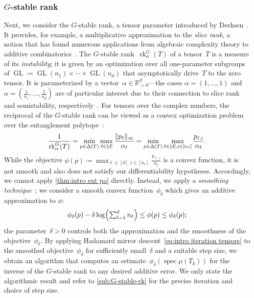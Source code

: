\documentclass[11pt,letterpaper]{article}
\numberwithin{equation}{section}
\newcommand{\RR}{\mathbb{R}}
\DeclareMathOperator{\spec}{spec}
\DeclareMathOperator{\rk}{rk}
\DeclareMathOperator{\GL}{GL}
\DeclarePairedDelimiter\norm{\lVert}{\rVert}
\begin{document}
\subsubsection{$G$-stable rank}
Next, we consider the $G$-stable rank, a tensor parameter introduced by Derksen~\cite{Derksen-22}.
It provides, for example, a multiplicative approximation to the \emph{slice rank}, a notion that has found numerous applications from algebraic complexity theory to additive combinatorics~\cite{Alon-13,Tao-16,Tao-Sawin-16,Blasiak-17,Kleinberg-18}.
The $G$-stable rank~$\rk^G_\alpha(T)$ of a tensor~$T$ is a measure of its \emph{instability}; it is given by an optimization over all one-parameter subgroups of $\GL \coloneqq \GL(n_1) \times \cdots \times \GL(n_d)$ that asymptotically drive~$T$ to the zero tensor.
It is parameterized by a vector~$\alpha\in\RR^d_{>0}$---the cases $\alpha=(1,\ldots,1)$ and $\alpha=(\frac{1}{n_1},\ldots,\frac{1}{n_d})$ are of particular interest due to their connection to slice rank and semistability, respectively~\cite[Props.~4.9 and~2.6]{Derksen-22}.
For tensors over the complex numbers, the reciprocal of the $G$-stable rank can be viewed as a convex optimization problem over the entanglement polytope~\cite{Derksen-22,Hirai2025}:
\[
    \frac1{\rk^G_\alpha(T)}
= \min_{p\in\Delta(T)}\max_{\ell\in [d]} \frac{\norm{p_\ell}_{\infty}}{\alpha_\ell}
= \min_{p\in\Delta(T)}\max_{\ell\in [d], i \in [n_\ell]} \frac{p_{\ell,i}}{\alpha_\ell}.
\]
While the objective $\phi(p)\coloneqq\max_{\ell\in [d],i \in [n_\ell]} \frac{p_{\ell,i}}{\alpha_\ell}$ is a convex function, it is not smooth and also does not satisfy our differentiability hypotheses.
Accordingly, we cannot apply \cref{thm:intro ent po} directly.
Instead, we apply a \emph{smoothing technique}~\cite{Nesterov-smoothing}; we consider a smooth convex function~$\phi_\delta$ which gives an additive approximation to $\phi$:
\[
    \phi_\delta(p)-\delta \log\mleft(\textstyle\sum_{\ell=1}^d n_\ell\mright) \leq \phi(p) \leq \phi_\delta(p);
\]
the parameter~$\delta>0$ controls both the approximation and the smoothness of the objective~$\phi_\delta$.
By applying Hadamard mirror descent~\eqref{eq:intro iteration tensors} to the smoothed objective~$\phi_\delta$ for sufficiently small~$\delta$ and a suitable step size, we obtain an algorithm that computes an estimate~$\phi_\delta(\spec\mu(T_k))$ for the inverse of the $G$-stable rank to any desired additive error.
We only state the algorithmic result and refer to \cref{sub:G-stable-rk} for the precise iteration and choice of step size.
\end{document}
